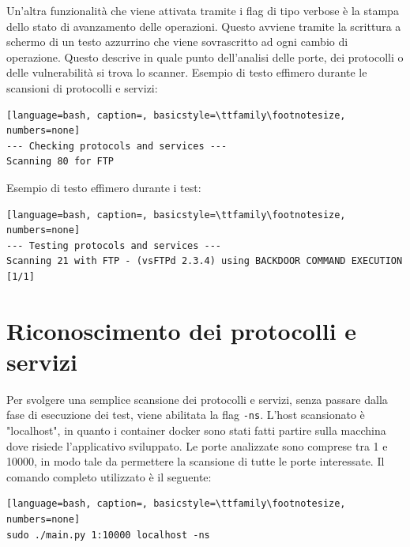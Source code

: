 \documentclass[12pt]{report}
\begin{document}
Un'altra funzionalità che viene attivata tramite i flag di tipo verbose è la stampa dello stato di avanzamento delle operazioni. Questo avviene tramite la scrittura a schermo di un testo azzurrino che viene sovrascritto ad ogni cambio di operazione. Questo descrive in quale punto dell'analisi delle porte, dei protocolli o delle vulnerabilità si trova lo scanner. 
\noindent
Esempio di testo effimero durante le scansioni di protocolli e servizi:

\begin{lstlisting}[language=bash, caption=, basicstyle=\ttfamily\footnotesize, numbers=none]
--- Checking protocols and services ---
Scanning 80 for FTP
\end{lstlisting}
Esempio di testo effimero durante i test:
\begin{lstlisting}[language=bash, caption=, basicstyle=\ttfamily\footnotesize, numbers=none]
--- Testing protocols and services ---  
Scanning 21 with FTP - (vsFTPd 2.3.4) using BACKDOOR COMMAND EXECUTION [1/1]
\end{lstlisting}

\newpage
\section{Riconoscimento dei protocolli e servizi}

Per svolgere una semplice scansione dei protocolli e servizi, senza passare dalla fase di esecuzione dei test, viene abilitata la flag \lstinline{-ns}. L'host scansionato è "localhost", in quanto i container docker sono stati fatti partire sulla macchina dove risiede l'applicativo sviluppato. Le porte analizzate sono comprese tra 1 e 10000, in modo tale da permettere la scansione di tutte le porte interessate. Il comando completo utilizzato è il seguente:
\begin{lstlisting}[language=bash, caption=, basicstyle=\ttfamily\footnotesize, numbers=none]
sudo ./main.py 1:10000 localhost -ns
\end{lstlisting}
\end{document}
